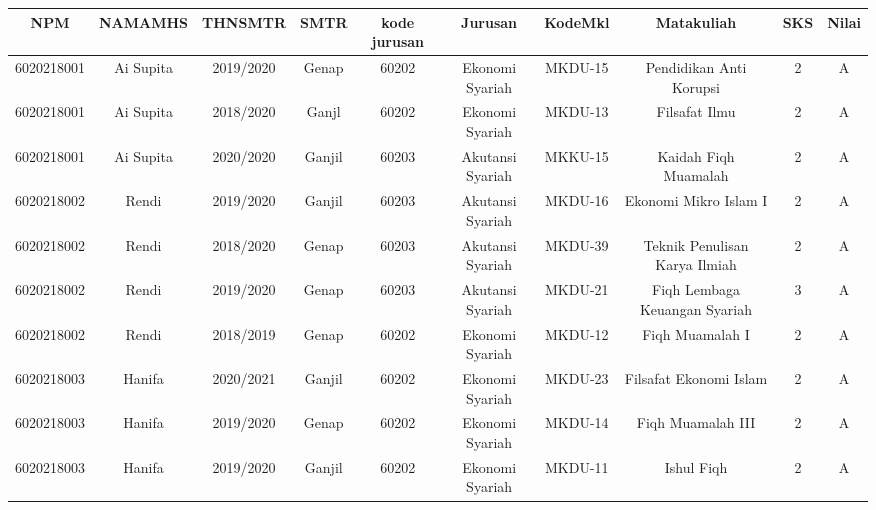 \documentclass[12pt,a4paper]{article}
\begin{document}
\begin{enumerate}
\begin{enumerate}
            \begin{center}
              \begin{adjustbox}{width=\linewidth,center}
                \begin{tabular}{ |c|c|c|c|c|c|c|c|c|c| } 
                  \hline
                  NPM        & NAMAMHS   & THNSMTR   & SMTR    & kode jurusan & Jurusan         & KodeMkl & Matakuliah                     & SKS  & Nilai \\ \hline \hline
                  6020218001 & Ai Supita & 2019/2020 & Genap   & 60202        & Ekonomi Syariah & MKDU-15 & Pendidikan Anti Korupsi        & 2    & A     \\ \hline
                  6020218001 & Ai Supita & 2018/2020 & Ganjl   & 60202        & Ekonomi Syariah & MKDU-13 & Filsafat Ilmu           	     & 2    & A     \\ \hline
                  6020218001 & Ai Supita & 2020/2020 & Ganjil  & 60203        & Akutansi Syariah & MKKU-15 & Kaidah Fiqh Muamalah          & 2    & A     \\ \hline
                  6020218002 & Rendi     & 2019/2020 & Ganjil  & 60203        & Akutansi Syariah & MKDU-16 & Ekonomi Mikro Islam I         & 2    & A     \\ \hline
                  6020218002 & Rendi     & 2018/2020 & Genap   & 60203        & Akutansi Syariah & MKDU-39 & Teknik Penulisan Karya Ilmiah & 2    & A     \\ \hline
                  6020218002 & Rendi     & 2019/2020 & Genap   & 60203        & Akutansi Syariah & MKDU-21 & Fiqh Lembaga Keuangan Syariah & 3    & A     \\ \hline
                  6020218002 & Rendi     & 2018/2019 & Genap   & 60202        & Ekonomi Syariah  & MKDU-12 & Fiqh Muamalah I               & 2    & A     \\ \hline
                  6020218003 & Hanifa    & 2020/2021 & Ganjil  & 60202        & Ekonomi Syariah  & MKDU-23 & Filsafat Ekonomi Islam        & 2    & A     \\ \hline
                  6020218003 & Hanifa    & 2019/2020 & Genap   & 60202        & Ekonomi Syariah  & MKDU-14 & Fiqh Muamalah III             & 2    & A     \\ \hline
                  6020218003 & Hanifa    & 2019/2020 & Ganjil  & 60202        & Ekonomi Syariah  & MKDU-11 & Ishul Fiqh                    & 2    & A     \\ 
                  \hline
                \end{tabular}
              \end{adjustbox}
            \end{center}


\end{enumerate}
\end{enumerate}
\end{document}
